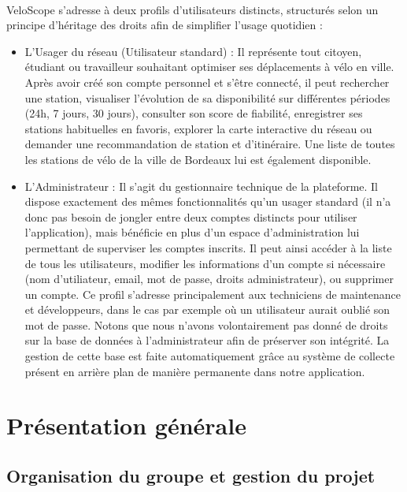 \documentclass[
  french,
  11pt,
  a4paper,
]{article}
\begin{document}
~~~~~~~~

VeloScope s'adresse à deux profils d'utilisateurs distincts, structurés
selon un principe d'héritage des droits afin de simplifier l'usage
quotidien :

\begin{itemize}
\item
  L'Usager du réseau (Utilisateur standard) : Il représente tout
  citoyen, étudiant ou travailleur souhaitant optimiser ses déplacements
  à vélo en ville. Après avoir créé son compte personnel et s'être
  connecté, il peut rechercher une station, visualiser l'évolution de sa
  disponibilité sur différentes périodes (24h, 7 jours, 30 jours),
  consulter son score de fiabilité, enregistrer ses stations habituelles
  en favoris, explorer la carte interactive du réseau ou demander une
  recommandation de station et d'itinéraire. Une liste de toutes les
  stations de vélo de la ville de Bordeaux lui est également disponible.
\item
  L'Administrateur : Il s'agit du gestionnaire technique de la
  plateforme. Il dispose exactement des mêmes fonctionnalités qu'un
  usager standard (il n'a donc pas besoin de jongler entre deux comptes
  distincts pour utiliser l'application), mais bénéficie en plus d'un
  espace d'administration lui permettant de superviser les comptes
  inscrits. Il peut ainsi accéder à la liste de tous les utilisateurs,
  modifier les informations d'un compte si nécessaire (nom d'utiliateur,
  email, mot de passe, droits administrateur), ou supprimer un compte.
  Ce profil s'adresse principalement aux techniciens de maintenance et
  développeurs, dans le cas par exemple où un utilisateur aurait oublié
  son mot de passe. Notons que nous n'avons volontairement pas donné de
  droits sur la base de données à l'administrateur afin de préserver son
  intégrité. La gestion de cette base est faite automatiquement grâce au
  système de collecte présent en arrière plan de manière permanente dans
  notre application.
\end{itemize}

\pagebreak

\section{Présentation générale}\label{pruxe9sentation-guxe9nuxe9rale}

\subsection{Organisation du groupe et gestion du
projet}\label{organisation-du-groupe-et-gestion-du-projet}
\end{document}
